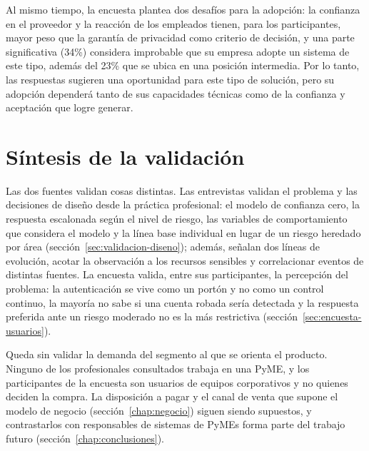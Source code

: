 Al mismo tiempo, la encuesta plantea dos desafíos para la adopción: la confianza en el proveedor y la reacción de los empleados tienen, para los participantes, mayor peso que la garantía de privacidad como criterio de decisión, y una parte significativa (34\%) considera improbable que su empresa adopte un sistema de este tipo, además del 23\% que se ubica en una posición intermedia. Por lo tanto, las respuestas sugieren una oportunidad para este tipo de solución, pero su adopción dependerá tanto de sus capacidades técnicas como de la confianza y aceptación que logre generar.

\section{Síntesis de la validación}\label{sec:sintesis-validacion}
Las dos fuentes validan cosas distintas. Las entrevistas validan el problema y las decisiones de diseño desde la práctica profesional: el modelo de confianza cero, la respuesta escalonada según el nivel de riesgo, las variables de comportamiento que considera el modelo y la línea base individual en lugar de un riesgo heredado por área (sección~\ref{sec:validacion-diseno}); además, señalan dos líneas de evolución, acotar la observación a los recursos sensibles y correlacionar eventos de distintas fuentes. La encuesta valida, entre sus participantes, la percepción del problema: la autenticación se vive como un portón y no como un control continuo, la mayoría no sabe si una cuenta robada sería detectada y la respuesta preferida ante un riesgo moderado no es la más restrictiva (sección~\ref{sec:encuesta-usuarios}).

Queda sin validar la demanda del segmento al que se orienta el producto. Ninguno de los profesionales consultados trabaja en una PyME, y los participantes de la encuesta son usuarios de equipos corporativos y no quienes deciden la compra. La disposición a pagar y el canal de venta que supone el modelo de negocio (sección~\ref{chap:negocio}) siguen siendo supuestos, y contrastarlos con responsables de sistemas de PyMEs forma parte del trabajo futuro (sección~\ref{chap:conclusiones}).
